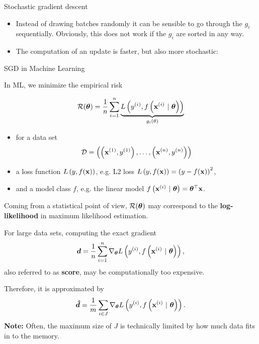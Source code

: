 \documentclass[11pt,compress,t,notes=noshow, xcolor=table]{beamer}
\begin{document}
\begin{vbframe}{Stochastic gradient descent}
\begin{footnotesize}
	\begin{itemize}
		\item Instead of drawing batches randomly it can be sensible to go through the $g_i$ sequentially. Obviously, this does not work if the $g_i$ are sorted in any way.
		\item The computation of an update is faster, but also more stochastic: 
		\begin{itemize} 
		\end{itemize} 
	\end{itemize}
\end{footnotesize}

\end{vbframe}

\begin{vbframe}{SGD in Machine Learning}

	In ML, we minimize the empirical risk 

	$$
		\mathcal{R}(\bm{\theta}) = \frac{1}{n}\sum\limits_{i=1}^n \underbrace{L\left(y^{(i)}, f\left(\mathbf{x}^{(i)} ~|~ \bm{\theta}\right)\right)}_{g_i(\theta)}
	$$

	\begin{itemize}
		\item for a data set 
		$$\mathcal{D} = \left( \left(\mathbf{x}^{(1)}, y^{(1)}\right), \ldots, \left(\mathbf{x}^{(n)}, y^{(n)}\right)\right)$$
		\item a loss function $L\left(y, f(\mathbf{x})\right)$,
		e.g. L2 loss $L\left(y, f(\mathbf{x})\right) = \left(y - f(\mathbf{x})\right)^2$,
		\item and a model class $f$, e.g. the linear model $f\left(\mathbf{x}^{(i)} ~|~ \bm{\theta}\right) = \bm{\theta}^\top \mathbf{x}$. 
	\end{itemize}

	\lz

	Coming from a statistical point of view, $\mathcal{R}(\bm{\theta})$ may correspond to the \textbf{log-likelihood} in maximum likelihood estimation.

	\framebreak 

	For large data sets, computing the exact gradient 
	$$
		\bm{d} = \frac{1}{n}\sum_{i=1}^n \nabla_{\bm{\theta}} L\left(y^{(i)}, f\left(\mathbf{x}^{(i)} ~|~ \bm{\theta}\right)\right),
	$$ 
	also referred to as \textbf{score}, may be computationally too expensive. 

	Therefore, it is approximated by 
	$$
	\bm{\hat d} = \frac{1}{m}\sum_{i \in J} \nabla_{\bm{\theta}} L\left(y^{(i)}, f\left(\mathbf{x}^{(i)} ~|~ \bm{\theta}\right)\right). 
	$$
	\textbf{Note:} Often, the maximum size of $J$ is technically limited by how much data fits in to the memory. 
\end{vbframe}
\end{document}
